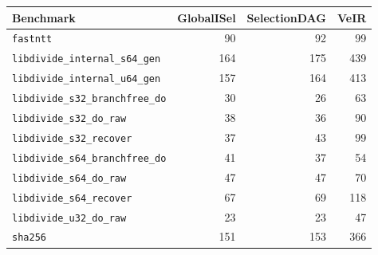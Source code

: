     \centering
    \footnotesize
    \begin{tabular}{l r r r }
        \toprule
        \textbf{Benchmark} & \textbf{GlobalISel} & \textbf{SelectionDAG} & \textbf{VeIR} \\
        \midrule
        \texttt{fastntt} & 90 & 92 & 99 \\
        \texttt{libdivide\_internal\_s64\_gen} & 164 & 175 & 439 \\
        \texttt{libdivide\_internal\_u64\_gen} & 157 & 164 & 413 \\
        \texttt{libdivide\_s32\_branchfree\_do} & 30 & 26 & 63 \\
        \texttt{libdivide\_s32\_do\_raw} & 38 & 36 & 90 \\
        \texttt{libdivide\_s32\_recover} & 37 & 43 & 99 \\
        \texttt{libdivide\_s64\_branchfree\_do} & 41 & 37 & 54 \\
        \texttt{libdivide\_s64\_do\_raw} & 47 & 47 & 70 \\
        \texttt{libdivide\_s64\_recover} & 67 & 69 & 118 \\
        \texttt{libdivide\_u32\_do\_raw} & 23 & 23 & 47 \\
        \texttt{sha256} & 151 & 153 & 366 \\
        \bottomrule
    \end{tabular}
    \caption{\#Instructions per iteration}
    \label{tot_instructions_table_real}